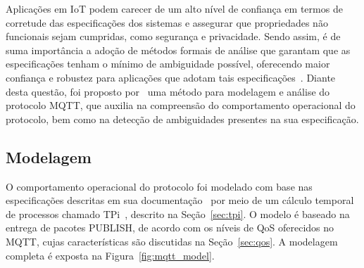 Aplicações em IoT podem carecer de um alto nível de confiança em termos de corretude das especificações dos sistemas e assegurar que propriedades não funcionais sejam cumpridas, como segurança e privacidade. Sendo assim, é de suma importância a adoção de métodos formais de análise que garantam que as especificações tenham o mínimo de ambiguidade possível, oferecendo maior confiança e robustez para aplicações que adotam tais especificações~\cite{aziz2016formal}. Diante desta questão, foi proposto por~\citeauthor{aziz2016formal} uma método para modelagem e análise do protocolo MQTT, que auxilia na compreensão do comportamento operacional do protocolo, bem como na detecção de ambiguidades presentes na sua especificação.

\subsection*{Modelagem}

O comportamento operacional do protocolo foi modelado com base nas especificações descritas em sua documentação~\cite{mqttv3.1.1} por meio de um cálculo temporal de processos chamado TPi~\cite{berger2003two}, descrito na Seção~\ref{sec:tpi}. O modelo é baseado na entrega de pacotes PUBLISH, de acordo com os níveis de QoS oferecidos no MQTT, cujas características são discutidas na Seção~\ref{sec:qos}. A modelagem completa é exposta na Figura~\ref{fig:mqtt_model}.

